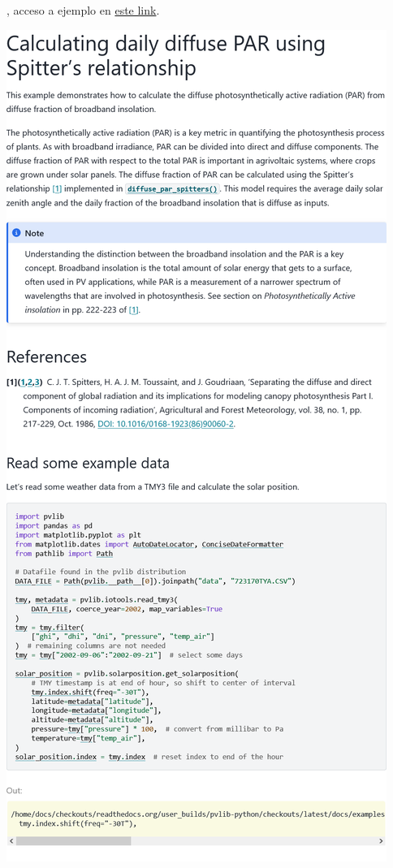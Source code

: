 \begin{myparindent}{0pt}
, acceso a ejemplo en \href{https://pvlib-python.readthedocs.io/en/latest/gallery/agrivoltaics/plot_diffuse_PAR_Spitters_relationship.html}{este link}.

\includegraphics[width=\linewidth,height=0.9\textheight,keepaspectratio]{images/docs_examples_cut/spitters_0.png}


\end{myparindent}

